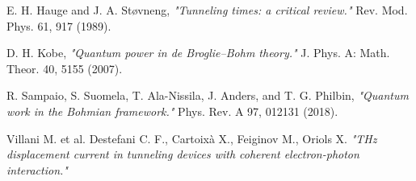 \documentclass[11pt, a4paper]{article} %
\begin{document}
\begin{thebibliography}{1}
{
E. H. Hauge and J. A. Støvneng, {\em "Tunneling times: a critical review."} Rev. Mod. Phys. 61, 917 (1989).

D. H. Kobe, {\em "Quantum power in de Broglie–Bohm theory."} J. Phys. A: Math. Theor. 40, 5155 (2007).

R. Sampaio, S. Suomela, T. Ala-Nissila, J. Anders, and T. G. Philbin, {\em "Quantum work in the Bohmian framework."} Phys. Rev. A 97, 012131 (2018).

Villani M. et al. Destefani C. F., Cartoixà X., Feiginov M., Oriols X. {\em "THz displacement current in tunneling devices with coherent electron-photon
interaction."}

}

\end{thebibliography}
\end{document}
